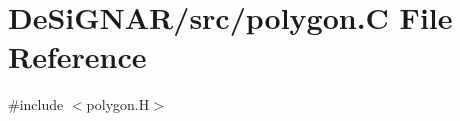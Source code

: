 \hypertarget{polygon_8_c}{}\section{De\+Si\+G\+N\+A\+R/src/polygon.C File Reference}
\label{polygon_8_c}
{\ttfamily \#include $<$polygon.\+H$>$}\newline
